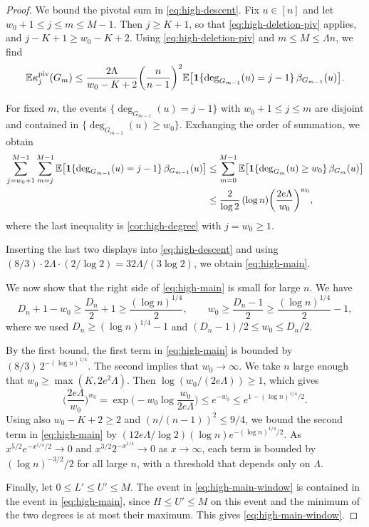 \begin{proof}
We bound the pivotal sum in \eqref{eq:high-descent}. Fix $u \in [n]$ and let $w_0 + 1 \le j \le m \le M - 1$. Then $j \ge K + 1$, so that \eqref{eq:high-deletion-piv} applies, and $j - K + 1 \ge w_0 - K + 2$. Using \eqref{eq:high-deletion-piv} and $m \le M \le \Lambda n$, we find
\[
\mathbb E \kappa_j^{\rm piv}(G_m) \le \frac{2 \Lambda}{w_0 - K + 2} \biggl( \frac{n}{n - 1} \biggr)^2 \mathbb E \bigl[ \mathbf 1 \{ \deg_{G_{m - 1}}(u) = j - 1 \} \, \beta_{G_{m - 1}}(u) \bigr].
\]

For fixed $m$, the events $\{ \deg_{G_{m - 1}}(u) = j - 1 \}$ with $w_0 + 1 \le j \le m$ are disjoint and contained in $\{ \deg_{G_{m - 1}}(u) \ge w_0 \}$. Exchanging the order of summation, we obtain
\[
\begin{split}
\sum_{j = w_0 + 1}^{M - 1} \sum_{m = j}^{M - 1} \mathbb E \bigl[ \mathbf 1 \{ \deg_{G_{m - 1}}(u) = j - 1 \} \, \beta_{G_{m - 1}}(u) \bigr] &\le \sum_{m = 0}^{M - 1} \mathbb E \bigl[ \mathbf 1 \{ \deg_{G_m}(u) \ge w_0 \} \, \beta_{G_m}(u) \bigr]\\
&\le \frac{2}{\log 2} \, (\log n) \biggl( \frac{2 e \Lambda}{w_0} \biggr)^{w_0},
\end{split}
\]
where the last inequality is \cref{cor:high-degree} with $j = w_0 \ge 1$.

Inserting the last two displays into \eqref{eq:high-descent} and using $(8/3) \cdot 2 \Lambda \cdot (2 / \log 2) = 32 \Lambda / (3 \log 2)$, we obtain \eqref{eq:high-main}.

We now show that the right side of \eqref{eq:high-main} is small for large $n$. We have
\[
D_n + 1 - w_0 \ge \frac{D_n}{2} + 1 \ge \frac{(\log n)^{1/4}}{2}, \qquad w_0 \ge \frac{D_n - 1}{2} \ge \frac{(\log n)^{1/4}}{2} - 1,
\]
where we used $D_n \ge (\log n)^{1/4} - 1$ and $(D_n - 1)/2 \le w_0 \le D_n/2$.

By the first bound, the first term in \eqref{eq:high-main} is bounded by $(8/3) \, 2^{-(\log n)^{1/4}}$. The second implies that $w_0 \to \infty$. We take $n$ large enough that $w_0 \ge \max(K, 2 e^2 \Lambda)$. Then $\log(w_0 / (2 e \Lambda)) \ge 1$, which gives
\[
\biggl( \frac{2 e \Lambda}{w_0} \biggr)^{w_0} = \exp \biggl( - w_0 \log \frac{w_0}{2 e \Lambda} \biggr) \le e^{-w_0} \le e^{1 - (\log n)^{1/4} / 2}.
\]
Using also $w_0 - K + 2 \ge 2$ and $(n/(n - 1))^2 \le 9/4$, we bound the second term in \eqref{eq:high-main} by $(12 e \Lambda / \log 2) (\log n) e^{-(\log n)^{1/4} / 2}$. As $x^{5/2} e^{-x^{1/4}/2} \to 0$ and $x^{3/2} 2^{-x^{1/4}} \to 0$ as $x \to \infty$, each term is bounded by $(\log n)^{-3/2} / 2$ for all large $n$, with a threshold that depends only on $\Lambda$.

Finally, let $0 \le L' \le U' \le M$. The event in \eqref{eq:high-main-window} is contained in the event in \eqref{eq:high-main}, since $H \le U' \le M$ on this event and the minimum of the two degrees is at most their maximum. This gives \eqref{eq:high-main-window}.
\end{proof}

